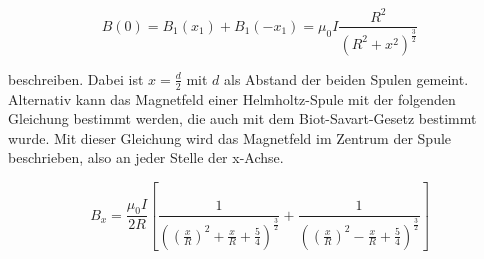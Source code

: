 \begin{equation*}
  B(0)=B_1(x_1) + B_1(-x_1) = \mu_0 I \frac{R^2}{(R^2 + x^2)^{\frac{3}{2}}}
\end{equation*}

beschreiben. Dabei ist $x=\frac{d}{2}$ mit $d$ als Abstand der beiden Spulen gemeint.\\
Alternativ kann das Magnetfeld einer Helmholtz-Spule mit der folgenden Gleichung bestimmt
werden, die auch mit dem Biot-Savart-Gesetz bestimmt wurde. Mit dieser Gleichung wird das
Magnetfeld im Zentrum der Spule beschrieben, also an jeder Stelle der x-Achse.

\begin{equation}
  B_x = \frac{\mu_0 I}{2R} \left[ \frac{1}{\left(\left(\frac{x}{R}\right)^2 + \frac{x}{R} + \frac{5}{4} \right)^{\frac{3}{2}}}
  + \frac{1}{\left(\left(\frac{x}{R}\right)^2 - \frac{x}{R} + \frac{5}{4} \right)^{\frac{3}{2}}}\right]
  \label{eq:8}
\end{equation}

